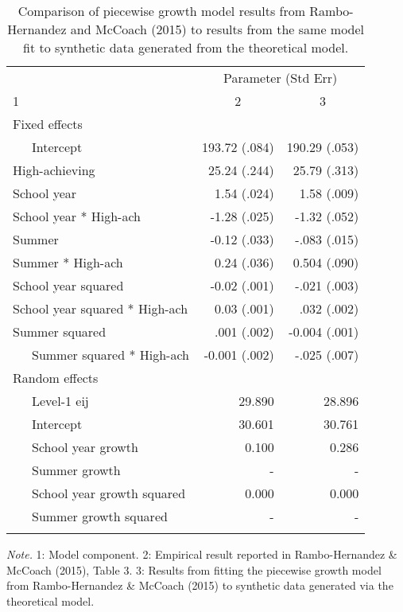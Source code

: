 \documentclass[english,floatsintext,jou]{apa6}
\theoremstyle{definition}
\theoremstyle{definition}
\theoremstyle{definition}
\theoremstyle{remark}
\begin{document}
\begin{table}[tbp]
\begin{center}
\begin{threeparttable}
\caption{\label{tab:RHM2015}Comparison of piecewise growth model results from Rambo-Hernandez and McCoach (2015) to results from the same model fit to synthetic data generated from the theoretical model.}
\small{
\begin{tabular}{lrr}
\toprule
 & \multicolumn{2}{c}{Parameter (Std Err)} \\
\cmidrule(r){2-3}
1 & \multicolumn{1}{c}{2} & \multicolumn{1}{c}{3}\\
\midrule
Fixed effects &  & \\
\ \ \ Intercept & 193.72 (.084) & 190.29 (.053)\\
High-achieving & 25.24 (.244) & 25.79 (.313)\\
School year & 1.54 (.024) & 1.58 (.009)\\
School year * High-ach & -1.28 (.025) & -1.32 (.052)\\
Summer & -0.12 (.033) & -.083 (.015)\\
Summer * High-ach & 0.24 (.036) & 0.504 (.090)\\
School year squared & -0.02 (.001) & -.021 (.003)\\
School year squared * High-ach & 0.03 (.001) & .032 (.002)\\
Summer squared & .001 (.002) & -0.004 (.001)\\
\ \ \ Summer squared * High-ach & -0.001 (.002) & -.025 (.007)\\ \midrule
Random effects &  & \\
\ \ \ Level-1 eij & 29.890 & 28.896\\
\ \ \ Intercept & 30.601 & 30.761\\
\ \ \ School year growth & 0.100 & 0.286\\
\ \ \ Summer growth & - & -\\
\ \ \ School year growth squared & 0.000 & 0.000\\
\ \ \ Summer growth squared & - & -\\
\bottomrule
\addlinespace
\end{tabular}
}
\begin{tablenotes}[para]
\textit{Note.} 1: Model component. 2: Empirical result reported in Rambo-Hernandez \& McCoach (2015), Table 3. 3: Results from fitting the piecewise growth model from Rambo-Hernandez \& McCoach (2015) to synthetic data generated via the theoretical model.
\end{tablenotes}
\end{threeparttable}
\end{center}
\end{table}
\end{document}
